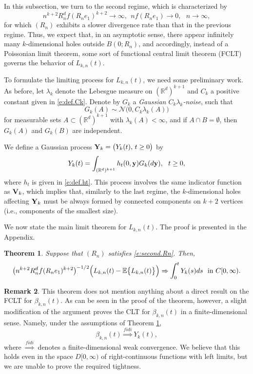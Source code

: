 \documentclass[11pt]{amsart}
\numberwithin{equation}{section}
\theoremstyle{plain}
\newtheorem{theorem}{Theorem}[section]
\theoremstyle{definition}
\newtheorem{remark}[theorem]{Remark}
\begin{document}
In this subsection, we turn to the second regime, which is characterized by
\begin{equation} \label{e:second.Rn}
n^{k+2} R_n^d f(R_ne_1)^{k+2} \to \infty, \ \  nf(R_ne_1) \to 0, \ \ \ n \to \infty,
\end{equation}
for which $(R_n)$ exhibits a slower divergence rate than that in the previous regime. Thus, we expect that, in an asymptotic sense, there  appear infinitely many $k$-dimensional holes outside $B(0;R_n)$, and accordingly, instead of a Poissonian limit theorem, some sort of functional central limit theorem (FCLT) governs the behavior of $L_{k,n}(t)$.

To formulate the limiting process for $L_{k,n}(t)$, we need some preliminary work. As before, let $\lambda_k$ denote the Lebesgue measure on $({{\mathbb R}}^d)^{k+1}$ and $C_k$ a positive constant given in \eqref{e:def.Ck}. Denote by $G_k$ a \textit{Gaussian $C_k\lambda_k$-noise}, such that
$$
G_k(A) \sim \mathcal N \bigl( 0, C_k\lambda_k(A) \bigr)
$$
for measurable sets $A \subset ({{\mathbb R}}^d)^{k+1}$ with $\lambda_k(A) < \infty$, and if $A \cap B = \emptyset$, then $G_k(A)$ and $G_k(B)$ are independent.

We define a Gaussian process ${{\bf Y}}_k = \bigl( Y_k(t), \, t\geq0 \bigr)$ by
$$
Y_k(t) = \int_{({{\mathbb R}}^d)^{k+1}} h_t(0,{{\bf y}}) G_k(d{{\bf y}}), \ \ t\geq 0,
$$
where $h_t$ is given in \eqref{e:def.ht}.
This process involves the same indicator function as  ${{\bf V}}_k$, which implies that, similarly to the last regime, the $k$-dimensional holes affecting ${{\bf Y}}_k$ must be always formed by connected components on $k+2$ vertices (i.e., components of the smallest size).

We now state the main limit theorem for $L_{k,n}(t)$. The proof is presented in the Appendix.
\begin{theorem}  \label{t:sparse.fclt}
Suppose that $(R_n)$ satisfies \eqref{e:second.Rn}. Then,
$$
\bigl( n^{k+2}R_n^d f(R_ne_1)^{k+2} \bigr)^{-1/2} \Bigl( L_{k,n}(t) - {\mathbb{E}} \bigl\{ L_{k,n}(t) \bigr\}\Bigr) \Rightarrow \int_0^t Y_k(s)ds \ \ \text{in } C[0,\infty).
$$
\end{theorem}
\begin{remark}  \label{r:betti.conv.second}
This theorem does not mention anything about a direct result on the FCLT for $\beta_{k,n}(t)$. As can be seen in the proof of the theorem, however, a slight modification of the argument proves the CLT for $\beta_{k,n}(t)$ in a finite-dimensional sense. Namely, under the assumptions of Theorem \ref{t:sparse.fclt},
$$
\beta_{k,n}(t) \stackrel{fidi}{\Rightarrow}  Y_k(t),
$$
where $\stackrel{fidi}{\Rightarrow}$ denotes a finite-dimensional weak convergence. We believe that this holds even in the space $D[0,\infty)$ of right-continuous functions with left limits, but we are unable to prove the required tightness.
\end{remark}
\end{document}
